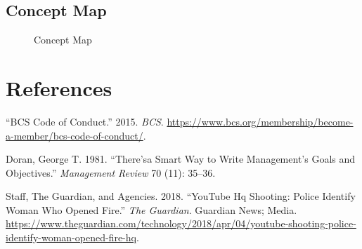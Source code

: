 \documentclass[
  english,
  a4paper,
,tablecaptionabove
]{scrartcl}
\begin{document}
\begin{landscape}

\pagestyle{empty}

\hypertarget{cmap}{%
\section{Concept Map}\label{cmap}}

\begin{figure}
    \caption{Concept Map} \label{fig:cmap}
\end{figure}

\end{landscape}

\newpage

\hypertarget{references}{%
\section*{References}\label{references}}

\hypertarget{refs}{}
\leavevmode\hypertarget{ref-bcs}{}%
``BCS Code of Conduct.'' 2015. \emph{BCS}.
\url{https://www.bcs.org/membership/become-a-member/bcs-code-of-conduct/}.

\leavevmode\hypertarget{ref-doran1981there}{}%
Doran, George T. 1981. ``There'sa Smart Way to Write Management's Goals
and Objectives.'' \emph{Management Review} 70 (11): 35--36.

\leavevmode\hypertarget{ref-agencies_2018}{}%
Staff, The Guardian, and Agencies. 2018. ``YouTube Hq Shooting: Police
Identify Woman Who Opened Fire.'' \emph{The Guardian}. Guardian News;
Media.
\url{https://www.theguardian.com/technology/2018/apr/04/youtube-shooting-police-identify-woman-opened-fire-hq}.
\end{document}
